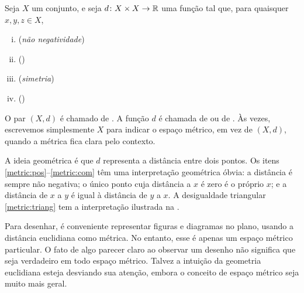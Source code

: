 \begin{defn}
Seja $X$ um conjunto, e seja
$d \colon X \times X \to {\mathbb{R}}$
uma função tal que, para quaisquer $x,y,z \in X$,
\begin{enumerate}[(i)]
%
\item \label{metric:pos}
(\emph{não negatividade})
%
\item \label{metric:zero}
(\emph{})
%
\item \label{metric:com}
(\emph{simetria})
%
\item \label{metric:triang}
(\emph{})
\end{enumerate}
O par $(X,d)$ é chamado de \emph{}. A função $d$ é
chamada de \emph{} ou de \emph{}.
Às vezes, escrevemos simplesmente $X$ para indicar o espaço métrico, em vez
de $(X,d)$, quando a métrica fica clara pelo contexto.
\end{defn}

A ideia geométrica é que $d$ representa a distância entre dois pontos.
Os itens \ref{metric:pos}--\ref{metric:com} têm uma interpretação geométrica
óbvia: a distância é sempre não negativa; o único ponto cuja distância a
$x$ é zero é o próprio $x$; e a distância de $x$ a $y$ é igual à distância
de $y$ a $x$. A desigualdade triangular \ref{metric:triang} tem a
interpretação ilustrada na .
\begin{myfigureht}
\caption{Diagrama da desigualdade triangular em espaços métricos.\label{fig:mstriang}}
\end{myfigureht}

Para desenhar, é conveniente representar figuras e diagramas no plano, usando
a distância euclidiana como métrica.
No entanto, esse é apenas um espaço métrico particular. O fato de algo parecer
claro ao observar um desenho não significa que seja verdadeiro em todo espaço
métrico.
Talvez a intuição da geometria euclidiana esteja desviando sua atenção, embora
o conceito de espaço métrico seja muito mais geral.

